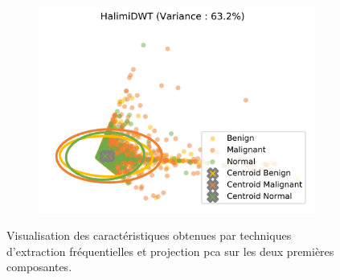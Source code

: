 \begin{figure}[H]
\begin{subfigure}{.3\textwidth}
      \includegraphics[width=\textwidth]{contents/chapter_4/resources/visualisation_frequency_HalimiDWT.png}
    \end{subfigure}
    
    \caption{Visualisation des caractéristiques obtenues par techniques d'extraction fréquentielles et projection \gls{pca} sur les deux premières composantes.}
    \label{fig:visualisation_frequency}
\end{figure}\par

